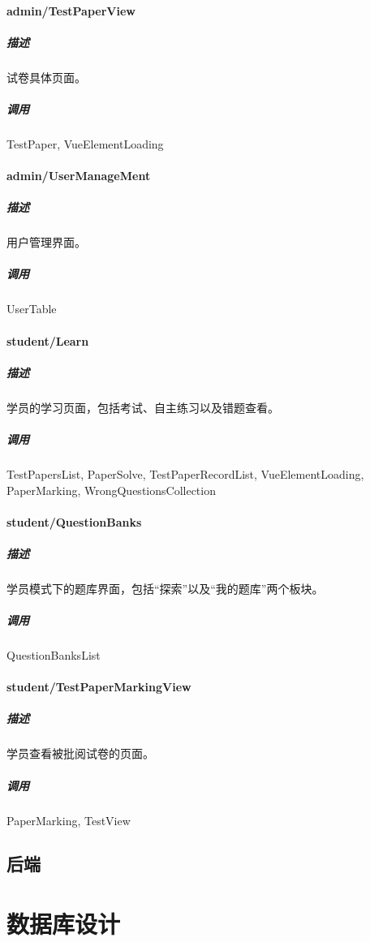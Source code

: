 \documentclass{article}
\begin{document}
        \paragraph{admin/TestPaperView}
            \subparagraph{描述}
                试卷具体页面。
            \subparagraph{调用}
                TestPaper, VueElementLoading
        \paragraph{admin/UserManageMent}
            \subparagraph{描述}
                用户管理界面。
            \subparagraph{调用}
                UserTable
        \paragraph{student/Learn}
            \subparagraph{描述}
                学员的学习页面，包括考试、自主练习以及错题查看。
            \subparagraph{调用}
                TestPapersList, PaperSolve, TestPaperRecordList, VueElementLoading, PaperMarking, WrongQuestionsCollection
        \paragraph{student/QuestionBanks}
            \subparagraph{描述}
                学员模式下的题库界面，包括“探索”以及“我的题库”两个板块。
            \subparagraph{调用}
                QuestionBanksList
        \paragraph{student/TestPaperMarkingView}
            \subparagraph{描述}
                学员查看被批阅试卷的页面。
            \subparagraph{调用}
                PaperMarking, TestView
    \subsection{后端}
    
\section{数据库设计}
\end{document}
